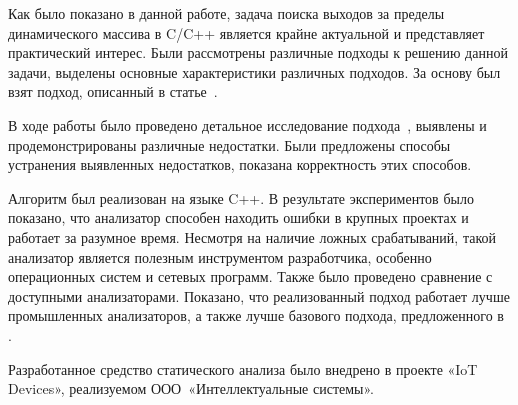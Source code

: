 
Как было показано в данной работе, задача поиска выходов за пределы
динамического массива в C/C++ является крайне актуальной и
представляет практический интерес. Были рассмотрены различные подходы
к решению данной задачи, выделены основные характеристики различных
подходов. За основу был взят подход, описанный в
статье~\cite{li2010practical}.

В ходе работы было проведено детальное исследование
подхода~\cite{li2010practical}, выявлены и продемонстрированы
различные недостатки. Были предложены способы устранения выявленных
недостатков, показана корректность этих способов.

Алгоритм был реализован на языке C++. В результате экспериментов было
показано, что анализатор способен находить ошибки в крупных проектах и
работает за разумное время. Несмотря на наличие ложных срабатываний,
такой анализатор является полезным инструментом разработчика, особенно
операционных систем и сетевых программ. Также было проведено сравнение
с доступными анализаторами. Показано, что реализованный подход
работает лучше промышленных анализаторов, а также лучше базового
подхода, предложенного в \cite{li2010practical}.

Разработанное средство статического анализа было внедрено в проекте
«IoT Devices», реализуемом ООО~«Интеллектуальные системы».

\FloatBarrier
